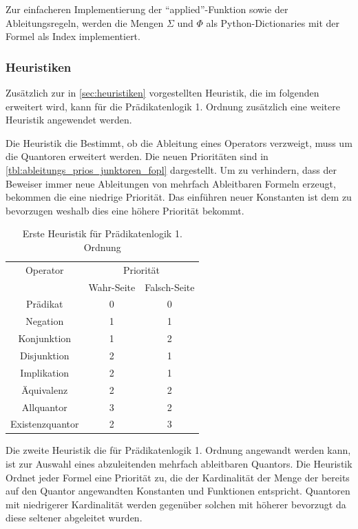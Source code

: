 Zur einfacheren Implementierung der ``applied''-Funktion sowie der Ableitungsregeln, werden die Mengen $\Sigma$ und $\Phi$ als Python-Dictionaries mit der Formel als Index implementiert.

\subsubsection{Heuristiken}
Zusätzlich zur in \autoref{sec:heuristiken} vorgestellten Heuristik, die im folgenden erweitert wird, kann für die Prädikatenlogik 1. Ordnung zusätzlich eine weitere Heuristik angewendet werden.

Die Heuristik die Bestimmt, ob die Ableitung eines Operators verzweigt, muss um die Quantoren erweitert werden. Die neuen Prioritäten sind in \autoref{tbl:ableitungs_prios_junktoren_fopl} dargestellt. Um zu verhindern, dass der Beweiser immer neue Ableitungen von mehrfach Ableitbaren Formeln erzeugt, bekommen die eine niedrige Priorität. Das einführen neuer Konstanten ist dem zu bevorzugen weshalb dies eine höhere Priorität bekommt.

\begin{table}[h]
\begin{center}
\begin{tabular}{|c|c|c|}
\hline
Operator & \multicolumn{2}{c|}{Priorität} \\
\cline{2-3}
 & Wahr-Seite & Falsch-Seite \\
\hline
Prädikat & 0 & 0 \\
Negation & 1 & 1 \\
Konjunktion & 1 & 2 \\
Disjunktion & 2 & 1 \\
Implikation & 2 & 1 \\
Äquivalenz & 2 & 2 \\
Allquantor & 3 & 2 \\
Existenzquantor & 2 & 3 \\
\hline
\end{tabular}
\end{center}
\caption{\label{tbl:ableitungs_prios_junktoren_pl}Erste Heuristik für Prädikatenlogik 1. Ordnung}
\end{table}

Die zweite Heuristik die für Prädikatenlogik 1. Ordnung angewandt werden kann, ist zur Auswahl eines abzuleitenden mehrfach ableitbaren Quantors. Die Heuristik Ordnet jeder Formel eine Priorität zu, die der Kardinalität der Menge der bereits auf den Quantor angewandten Konstanten und Funktionen entspricht. Quantoren mit niedrigerer Kardinalität werden gegenüber solchen mit höherer bevorzugt da diese seltener abgeleitet wurden.


